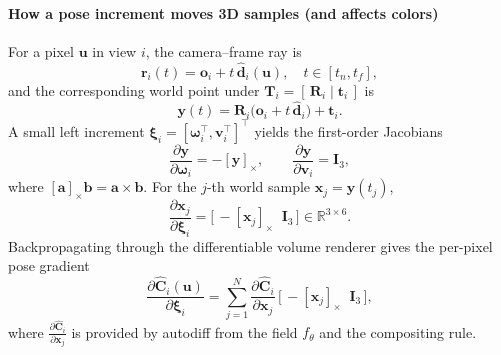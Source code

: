 \begin{enrichment}
\begin{enrichment}
        \paragraph{How a pose increment moves 3D samples (and affects colors)}
        For a pixel \(\mathbf{u}\) in view \(i\), the camera–frame ray is
        \[
        \mathbf{r}_i(t)=\mathbf{o}_i+t\,\widehat{\mathbf{d}}_i(\mathbf{u}),\quad t\in[t_n,t_f],
        \]
        and the corresponding world point under \(\mathbf{T}_i=[\,\mathbf{R}_i\mid\mathbf{t}_i\,]\) is
        \[
        \mathbf{y}(t)=\mathbf{R}_i\big(\mathbf{o}_i+t\,\widehat{\mathbf{d}}_i\big)+\mathbf{t}_i.
        \]
        A small left increment \(\boldsymbol{\xi}_i=[\boldsymbol{\omega}_i^\top,\mathbf{v}_i^\top]^\top\) yields the first-order Jacobians
        \[
        \frac{\partial \mathbf{y}}{\partial \boldsymbol{\omega}_i}=-[\mathbf{y}]_\times,
        \qquad
        \frac{\partial \mathbf{y}}{\partial \mathbf{v}_i}=\mathbf{I}_3,
        \]
        where \([\mathbf{a}]_\times\mathbf{b}=\mathbf{a}\times\mathbf{b}\).
        For the \(j\)-th world sample \(\mathbf{x}_j=\mathbf{y}(t_j)\),
        \[
        \frac{\partial \mathbf{x}_j}{\partial \boldsymbol{\xi}_i}
        =
        \big[\,-[\mathbf{x}_j]_\times \;\; \mathbf{I}_3 \,\big]\in\mathbb{R}^{3\times 6}.
        \]
        Backpropagating through the differentiable volume renderer gives the per-pixel pose gradient
        \[
        \frac{\partial \widehat{\mathbf{C}}_i(\mathbf{u})}{\partial \boldsymbol{\xi}_i}
        =
        \sum_{j=1}^{N}
        \frac{\partial \widehat{\mathbf{C}}_i}{\partial \mathbf{x}_j}\,
        \big[\,-[\mathbf{x}_j]_\times \;\; \mathbf{I}_3 \,\big],
        \]
        where \(\tfrac{\partial \widehat{\mathbf{C}}_i}{\partial \mathbf{x}_j}\) is provided by autodiff from the field \(f_\theta\) and the compositing rule.
        

\end{enrichment}
\end{enrichment}
